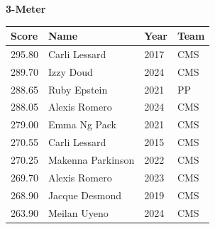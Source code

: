 \vspace{1.2em}
\noindent\begin{minipage}[t]{0.98\textwidth}
\centering
\textbf{\textcolor{teamprimary}{3-Meter}}\par
\vspace{0.5em}
\centering
\small
\renewcommand{\arraystretch}{1.0}
\setlength{\tabcolsep}{4pt}
\begin{tabular}{@{}p{2.5cm}p{4.5cm}p{1.5cm}p{2.5cm}@{}}
\toprule
\textbf{Score} & \textbf{Name} & \textbf{Year} & \textbf{Team} \\
\midrule
295.80 & Carli Lessard & 2017 & CMS \\
289.70 & Izzy Doud & 2024 & CMS \\
288.65 & Ruby Epstein & 2021 & PP \\
288.05 & Alexis Romero & 2024 & CMS \\
279.00 & Emma Ng Pack & 2021 & CMS \\
270.55 & Carli Lessard & 2015 & CMS \\
270.25 & Makenna Parkinson & 2022 & CMS \\
269.70 & Alexis Romero & 2023 & CMS \\
268.90 & Jacque Desmond & 2019 & CMS \\
263.90 & Meilan Uyeno & 2024 & CMS \\
\bottomrule
\end{tabular}
\end{minipage}
\clearpage
